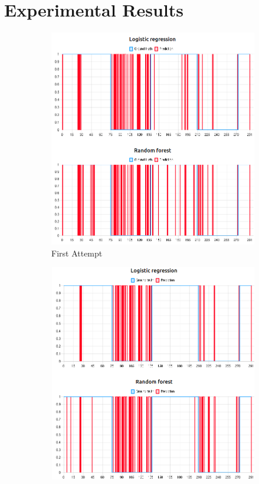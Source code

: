 \documentclass[12pt, conference]{IEEEtran}
\begin{document}
\section{Experimental Results}
\begin{figure}[t]
    \centering
    \begin{subfigure}[b]{.33\linewidth}
        \centering
        \includegraphics[width=\linewidth]{resources/prediction_with_basic_features_cropped.png}
        \caption{First Attempt}
        \label{fig:chart-first-attempt}
    \end{subfigure}%
    \begin{subfigure}[b]{.33\linewidth}
        \centering
        \includegraphics[width=\linewidth]{resources/prediction_with_inbound_and_outbound_features_cropped.png}

\end{subfigure}
\end{figure}
\end{document}
